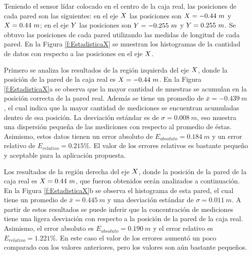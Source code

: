 Teniendo el sensor lídar colocado en el centro de la caja real, las posiciones
de cada pared son las siguientes: en el eje $\mathnormal X$ las posiciones 
son $\mathnormal X = -0.44~m$ y $\mathnormal X = 0.44~m$; en el eje $\mathnormal Y$ 
las posiciones son $\mathnormal Y = -0.255~m$ y $\mathnormal Y = 0.255~m$. Se obtuvo las
posiciones de cada pared utilizando las medidas de longitud de cada pared. En 
la Figura \ref{f:EstadisticaX} se muestran los histogramas de la cantidad de 
datos con respecto a las posiciones en el eje $\mathnormal X$.


Primero se analiza los resultados de la región izquierda del eje $\mathnormal X$, donde 
la posición de la pared de la caja real es $\mathnormal X = -0.44~m$. En la Figura 
\ref{f:EstadisticaX}a se observa que la mayor cantidad de muestras se acumulan en 
la posición correcta de la pared real. Además se tiene un promedio de 
$\bar{x} = -0.439~m$, el cual indica que la mayor cantidad de mediciones se 
encuentran acumuladas dentro de esa posición. La desviación estándar 
es de $\sigma = 0.008~m$, eso muestra una dispersión pequeña de las mediciones 
con respecto al promedio de éstas. Asimismo, estos datos tienen un 
error absoluto de $E_{absoluto} = 0.184~m$ y un error relativo de $E_{relativo} = 
0.215\%$. El valor de los errores relativos es bastante pequeño y aceptable para la 
aplicación propuesta.

Los resultados de la región derecha del eje $\mathnormal X$, donde la posición de la
pared de la caja real es $\mathnormal X = 0.44~m$, que fueron obtenidos serán analizados a 
continuación. En la Figura \ref{f:EstadisticaX}b se observa el histograma de esta 
pared, el cual tiene un promedio de $\bar{x} = 0.445~m$ y una desviación 
estándar de $\sigma = 0.011~m$. A partir de estos resultados se puede inferir que 
la concentración de mediciones tiene una ligera desviación con respecto a la 
posición de la pared de la caja real. Asimismo, el error absoluto es 
$E_{absoluto} = 0.190~m$ y el error relativo es $E_{relativo} = 1.221\%$. En este 
caso el valor de los errores aumentó un poco comparado con los valores 
anteriores, pero los valores son aún bastante pequeños.


